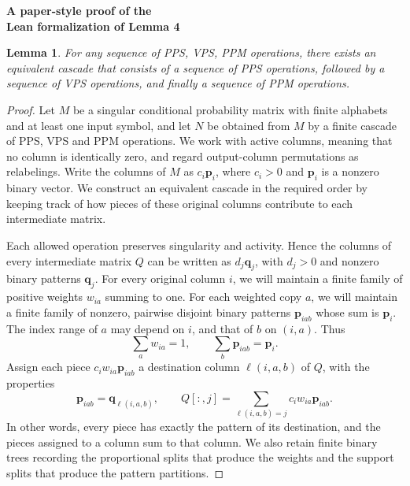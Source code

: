 \documentclass[12pt,a4paper]{article}
\newtheorem{lemma}{Lemma}
\newcommand{\pat}[1]{\boldsymbol{#1}}
\begin{document}
\begin{center}
{\Large\bfseries A paper-style proof of the\\[3pt]
Lean formalization of Lemma 4}
\end{center}
\smallskip

\setcounter{lemma}{3}
\begin{lemma}
For any sequence of PPS, VPS, PPM operations, there exists an equivalent
cascade that consists of a sequence of PPS operations, followed by a
sequence of VPS operations, and finally a sequence of PPM operations.
\end{lemma}

\begin{proof}
Let $M$ be a singular conditional probability matrix with finite alphabets
and at least one input symbol, and let $N$ be obtained from $M$ by a finite
cascade of PPS, VPS and PPM operations. We work with active columns, meaning
that no column is identically zero, and regard output-column permutations
as relabelings. Write the columns of $M$ as $c_i\pat{p}_i$, where $c_i>0$
and $\pat{p}_i$ is a nonzero binary vector. We construct an equivalent
cascade in the required order by keeping track of how pieces of these
original columns contribute to each intermediate matrix.

Each allowed operation preserves singularity and activity. Hence the
columns of every intermediate matrix $Q$ can be written as
$d_j\pat{q}_j$, with $d_j>0$ and nonzero binary patterns $\pat{q}_j$.
For every original column $i$, we will maintain a finite family of
positive weights $w_{ia}$ summing to one. For each weighted copy $a$, we
will maintain a finite family of nonzero, pairwise disjoint binary
patterns $\pat{p}_{iab}$ whose sum is $\pat{p}_i$. The index range of $a$
may depend on $i$, and that of $b$ on $(i,a)$. Thus
\begin{equation}
  \sum_a w_{ia}=1, \qquad \sum_b \pat{p}_{iab}=\pat{p}_i.
  \label{eq:partitions}
\end{equation}
Assign each piece $c_iw_{ia}\pat{p}_{iab}$ a destination column
$\ell(i,a,b)$ of $Q$, with the properties
\begin{equation}
  \pat{p}_{iab}=\pat{q}_{\ell(i,a,b)}, \qquad
  Q[:,j]=\sum_{\ell(i,a,b)=j} c_iw_{ia}\pat{p}_{iab}.
  \label{eq:destinations}
\end{equation}
In other words, every piece has exactly the pattern of its destination,
and the pieces assigned to a column sum to that column. We also retain
finite binary trees recording the proportional splits that produce the
weights and the support splits that produce the pattern partitions.


\end{proof}
\end{document}
